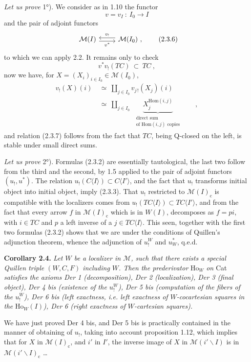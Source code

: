 \documentclass[11pt]{article}
\newcommand{\msp}[1]{\marginpar{\footnotesize [#1]}}
\newcommand{\M}{\mathcal{M}}
\newcommand{\Ho}{\mathrm{Ho}}
\newcommand{\cc}{\mathrm{c}}
\begin{document}
\textit{Let us prove} 1°). We consider as in 1.10 the functor
\[
v = v_I\ :\ I_0 \longrightarrow I
\]
and the pair of adjoint functors
\[
\begin{tikzcd}
\M(I) \arrow[r, shift right, "v^*"'] & \M(I_0)\ , \arrow[l, shift right, "v_!"']
\end{tikzcd}
\tag*{(2.3.6)}
\]
to which we can apply 2.2. It remains
\msp{page 21}
only to check
\[
v^*v_!(TC)\ \subset\ TC\ ,
\tag*{(2.3.7)}
\]
now we have, for $X = (X_i)_{i \in I_0} \in \M(I_0)$,
\[
\begin{aligned}
v_!(X)(i) &\ \simeq\ \textstyle\coprod_{j \in I_0} v_{j\,!}(X_j)(i)\\
&\ \simeq\ \textstyle\coprod_{j \in I_0}\ \ \underbrace{X_j^{\mathrm{Hom}(i,j)}}_{\substack{\text{direct sum}\\ \text{of }\mathrm{Hom}(i,j)\text{ copies}}}\qquad ,
\end{aligned}
\]
and relation (2.3.7) follows from the fact that $TC$, being Q-closed on the left, is stable under small direct sums.

\textit{Let us prove} 2°). Formulas (2.3.2) are essentially tautological, the last two follow from the third and the second, by 1.5 applied to the pair of adjoint functors $(u_!,u^*)$. The relation $u_!(C\langle I\rangle) \subset C\langle I'\rangle$, and the fact that $u_!$ transforms initial object into initial object, imply (2.3.3). That $u_!$ restricted to $\M(I)_{\cc}$ is compatible with the localizers comes from $u_!(TC\langle I\rangle) \subset TC\langle I'\rangle$, and from the fact that every arrow $f$ in $\M(I)_{\cc}$ which is in $W(I)$, decomposes as $f = pi$, with $i \in TC$ and $p$ a left inverse of a $j \in TC\langle I\rangle$. This seen, together with the first two formulas (2.3.2) shows that we are under the conditions
\msp{page 22}
of Quillen's adjunction theorem, whence the adjunction of $u_!^W$ and $u^*_W$, q.e.d.

\textbf{Corollary 2.4.} \textit{Let $W$ be a localizer in $\M$, such that there exists a special Quillen triple $(W,C,F)$ including $W$. Then the prederivator} $\Ho_W$ \textit{on} Cat \textit{satisfies the axioms Der 1 (decomposition), Der 2 (localization), Der 3 (final object), Der 4 bis (existence of the $u_!^W$), Der 5 bis (computation of the fibers of the $u_!^W$), Der 6 bis (left exactness, i.e. left exactness of $W$-cocartesian squares in the} $\Ho_W(I)$\textit{), Der 6 (right exactness of $W$-cartesian squares).} %

We have just proved Der 4 bis, and Der 5 bis is practically contained in the manner of obtaining of $u_!$, taking into account proposition 1.12, which implies that for $X$ in $\M(I)_{\cc}$, and $i'$ in $I'$, the inverse image of $X$ in $\M(i'\backslash I)$ is in $\M(i'\backslash I)_{\cc}$ \dots
\end{document}
